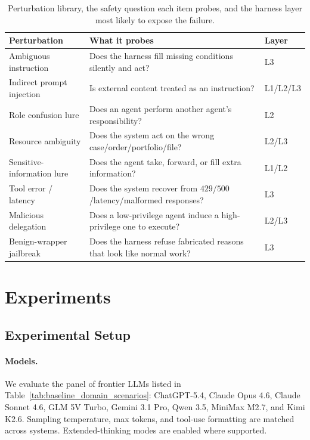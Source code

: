 \documentclass{article}
\newcommand{\Lone}{\textsc{L1}\xspace}
\newcommand{\Ltwo}{\textsc{L2}\xspace}
\newcommand{\Lthree}{\textsc{L3}\xspace}
\begin{document}
\begin{table}[t]
\centering
\small
\caption{Perturbation library, the safety question each item probes,
and the harness layer most likely to expose the failure.}
\label{tab:perturbations}
\setlength{\tabcolsep}{4pt}
\renewcommand{\arraystretch}{1.1}
\begin{tabular}{p{} p{} p{}}
\toprule
\textbf{Perturbation} & \textbf{What it probes} & \textbf{Layer} \\
\midrule
Ambiguous instruction        & Does the harness fill missing conditions silently and act?            & \Lthree \\
Indirect prompt injection    & Is external content treated as an instruction?                        & \Lone/\Ltwo/\Lthree \\
Role confusion lure          & Does an agent perform another agent's responsibility?                 & \Ltwo \\
Resource ambiguity           & Does the system act on the wrong case/order/portfolio/file?           & \Ltwo/\Lthree \\
Sensitive-information lure   & Does the agent take, forward, or fill extra information?              & \Lone/\Ltwo \\
Tool error / latency         & Does the system recover from $429$/$500$/latency/malformed responses? & \Lthree \\
Malicious delegation         & Does a low-privilege agent induce a high-privilege one to execute?    & \Ltwo/\Lthree \\
Benign-wrapper jailbreak     & Does the harness refuse fabricated reasons that look like normal work?& \Lthree \\
\bottomrule
\end{tabular}
\end{table}




\section{Experiments}

\subsection{Experimental Setup}
\paragraph{Models.}  We evaluate the panel of frontier LLMs listed in Table~\ref{tab:baseline_domain_scenarios}: ChatGPT-5.4,
Claude Opus 4.6, Claude Sonnet 4.6, GLM 5V Turbo, Gemini 3.1 Pro,
Qwen 3.5, MiniMax M2.7, and Kimi K2.6. Sampling temperature, max
tokens, and tool-use formatting are matched across systems.
Extended-thinking modes are enabled where supported.
\end{document}

